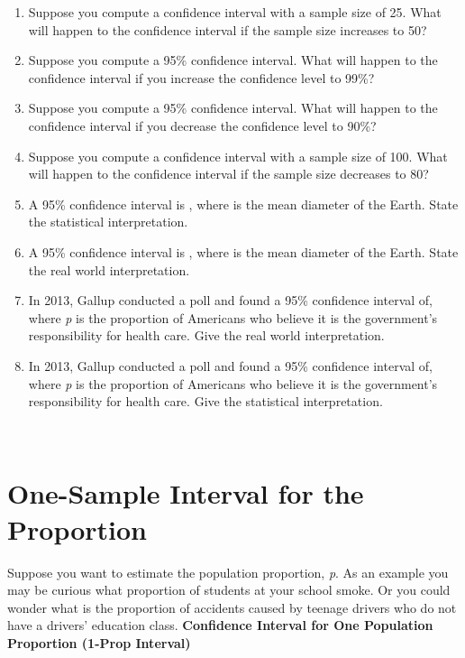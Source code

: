 \documentclass[]{book}
\begin{document}
\begin{enumerate}
\def\labelenumi{\arabic{enumi}.}
\item
  Suppose you compute a confidence interval with a sample size of 25. What will happen to the confidence interval if the sample size increases to 50?
\item
  Suppose you compute a 95\% confidence interval. What will happen to the confidence interval if you increase the confidence level to 99\%?
\item
  Suppose you compute a 95\% confidence interval. What will happen to the confidence interval if you decrease the confidence level to 90\%?
\item
  Suppose you compute a confidence interval with a sample size of 100. What will happen to the confidence interval if the sample size decreases to 80?
\item
  A 95\% confidence interval is , where is the mean diameter of the Earth. State the statistical interpretation.
\item
  A 95\% confidence interval is , where is the mean diameter of the Earth. State the real world interpretation.
\item
  In 2013, Gallup conducted a poll and found a 95\% confidence interval of, where \emph{p} is the proportion of Americans who believe it is the government's responsibility for health care. Give the real world interpretation.
\item
  In 2013, Gallup conducted a poll and found a 95\% confidence interval of, where \emph{p} is the proportion of Americans who believe it is the government's responsibility for health care. Give the statistical interpretation.
\end{enumerate}

\textbf{~}

\hypertarget{one-sample-interval-for-the-proportion}{%
\section{One-Sample Interval for the Proportion}\label{one-sample-interval-for-the-proportion}}

Suppose you want to estimate the population proportion, \emph{p}. As an example you may be curious what proportion of students at your school smoke. Or you could wonder what is the proportion of accidents caused by teenage drivers who do not have a drivers' education class.
\textbf{Confidence Interval for One Population Proportion (1-Prop Interval)}
\end{document}
